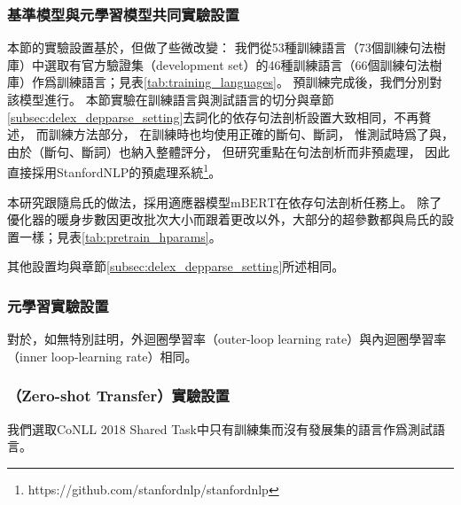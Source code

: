 \subsubsection{基準模型與元學習模型共同實驗設置}

本節的實驗設置基於，但做了些微改變：
我們從53種訓練語言（73個訓練句法樹庫）中選取有官方驗證集（development set）的46種訓練語言（66個訓練句法樹庫）作爲訓練語言；見表\ref{tab:training_languages}。
預訓練完成後，我們分別對該模型進行。
本節實驗在訓練語言與測試語言的切分與章節\ref{subsec:delex_depparse_setting}去詞化的依存句法剖析設置大致相同，不再贅述，
而訓練方法部分，
在訓練時也均使用正確的斷句、斷詞，
惟測試時爲了與，由於（斷句、斷詞）也納入整體評分，
但研究重點在句法剖析而非預處理，
因此直接採用StanfordNLP的預處理系統\cite{qi-etal-2018-universal}\footnote{https://github.com/stanfordnlp/stanfordnlp}。


本研究跟隨烏氏的做法，採用適應器模型\finetune $\mathrm{mBERT}$在依存句法剖析任務上。
除了優化器的暖身步數因更改批次大小而跟着更改以外，大部分的超參數都與烏氏的設置一樣；見表\ref{tab:pretrain_hparams}。

其他設置均與章節\ref{subsec:delex_depparse_setting}所述相同。

\subsubsection{元學習實驗設置}

對於\fomaml，如無特別註明，外迴圈學習率（outer-loop learning rate）與內迴圈學習率（inner loop-learning rate）相同。
\subsubsection{\zeroshot（Zero-shot Transfer）實驗設置}
我們選取CoNLL 2018 Shared Task中只有訓練集而沒有發展集的語言作爲測試語言。






